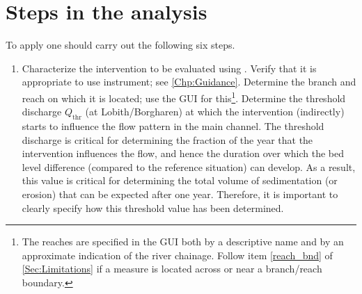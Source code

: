 \chapter{Steps in the analysis}\label{Chp:steps}

To apply \dfastmi one should carry out the following six steps.

\begin{enumerate}
\item Characterize the intervention to be evaluated using \dfmi.
Verify that it is appropriate to use \dfmi instrument; see \autoref{Chp:Guidance}.
Determine the branch and reach on which it is located; use the \dfmi GUI for this\footnote{The reaches are specified in the GUI both by a descriptive name and by an approximate indication of the river chainage.
Follow item \ref{reach_bnd} of \autoref{Sec:Limitations} if a measure is located across or near a branch/reach boundary.}.
Determine the threshold discharge $Q_\text{thr}$ (at Lobith/Borgharen) at which the intervention (indirectly) starts to influence the flow pattern in the main channel.
The threshold discharge is critical for determining the fraction of the year that the intervention influences the flow, and hence the duration over which the bed level difference (compared to the reference situation) can develop.
As a result, this value is critical for determining the total volume of sedimentation (or erosion) that can be expected after one year.
Therefore, it is important to clearly specify how this threshold value has been determined.


\end{enumerate}
